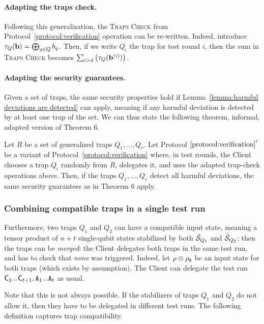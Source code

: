 \paragraph{Adapting the traps check.}
Following this generalization, the \textsc{Traps Check} from Protocol~\ref{protocol:verification} operation can be re-written. Indeed, introduce $\tau_Q(\mathbf b)=\bigoplus_{q\in Q} b_q$. Then, if we write $Q_i$ the trap for test round $i$, then the sum in \textsc{Traps Check} becomes $\sum_{i>d} \left(
        \tau_Q(\mathbf b^{(i)})
    \right)$.

\paragraph{Adapting the security guarantees.}
Given a set of traps, the same security properties hold if Lemma~\ref{lemma:harmful deviations are detected} can apply, meaning if any harmful deviation is detected by at least one trap of the set. We can thus state the following theorem, informal, adapted version of Theorem 6.

\begin{theorem}[Informal]
    Let $R$ be a set of generalized traps $Q_1, ..., Q_r$. Let Protocol $\ref{protocol:verification}'$ be a variant of Protocol~\ref{protocol:verification} where, in test rounds, the Client chooses a trap $Q_i$ randomly from $R$, delegates it, and uses the adapted trap-check operations above. Then, if the traps $Q_1, ..., Q_r$ detect all harmful deviations, the same security guarantees as in Theorem 6 apply.
\end{theorem}

\subsubsection{Combining compatible traps in a single test run}

Furthermore, two traps $Q_1$ and $Q_2$ can have a compatible input state, meaning a tensor product of $n+t$ single-qubit states stabilized by both $\hat{\mathcal{S}}_{Q_1}$ and $\hat{\mathcal{S}}_{Q_2}$; then the traps can be \emph{merged}: the Client delegates both traps in the same test run, and has to check that \emph{none} was triggered. Indeed, let $\rho\otimes\rho_{\mathtt{A}}$ be an input state for both traps (which exists by assumption). The Client can delegate the test run $\mathsf{C}_1...\mathsf{C}_{t+1},\mathtt{A}_1...\mathtt{A}_t$ as usual.

Note that this is not always possible. If the stabilizers of traps $Q_1$ and $Q_2$ do not allow it, then they have to be delegated in different test runs. The following definition captures trap compatibility.

